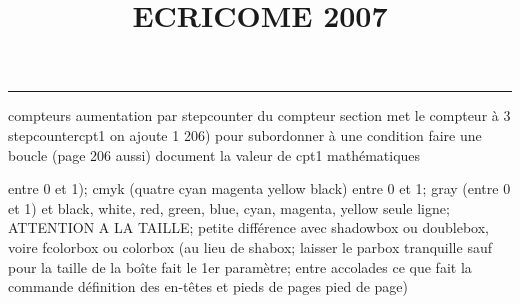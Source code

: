\documentclass[11pt]{article}%
\title{\bf \vspace{-2cm} ECRICOME 2007} %
\author{} %
\date{} %
\renewcommand{\headrulewidth}{0pt}%
\renewcommand{\footrulewidth}{0.4pt}%
\begin{document}
\maketitle %
\vspace{-1.4cm}\hrule %
\thispagestyle{fancy}

\vspace*{.2cm}



compteurs%
aumentation par stepcounter du compteur section%
met le compteur à 3%
stepcounter{cpt1} on ajoute 1%
206) pour subordonner à une condition %
faire une boucle (page 206 aussi) %
document la valeur de cpt1 
mathématiques\newcommand{\ch}{\operatorname{ch}} 
\newcommand{\sh}{\operatorname{sh}}
\renewcommand{\tanh}{\operatorname{th}}
\renewcommand{\sinh}{\operatorname{sh}}
\renewcommand{\cosh}{\operatorname{ch}}
\newcommand{\argsh}{\operatorname{argsh}}
\newcommand{\argch}{\operatorname{argch}}
\newcommand{\argth}{\operatorname{argth}}
\newcommand{\Id}{\operatorname{Id}}
\renewcommand{\leq}{\leq}
\renewcommand{\geq}{\geq }

\newcommand{\dlim}{\lim}
\newcommand{\dsum}{\sum}
\newcommand{\dprod}{\prod}



entre 0 et 1); cmyk (quatre cyan magenta yellow black) entre 0 et 1;
gray (entre 0 et 1) et black, white, red, green, blue, cyan, magenta,
yellow%
seule ligne; ATTENTION A LA TAILLE; petite différence avec shadowbox ou
doublebox, voire fcolorbox ou colorbox (au lieu de shabox; laisser le
parbox tranquille sauf pour la taille de la boîte
\newcommand{\Tbox}[1]{\begin{center} \shabox{\parbox{0.6
\linewidth}{#1}} \end{center}} %
fait le 1er paramètre; entre accolades ce que fait la commande
définition des en-têtes et pieds de pages\pagestyle{fancy}
\chead{}
\rfoot[ \ \thepage]{\thepage}
\cfoot{}
\lfoot{}
\thispagestyle{fancy} %
pied de page)\renewcommand{\footrulewidth}{0.4pt}
\renewcommand{\headrulewidth}{0.4pt}
\end{document}
